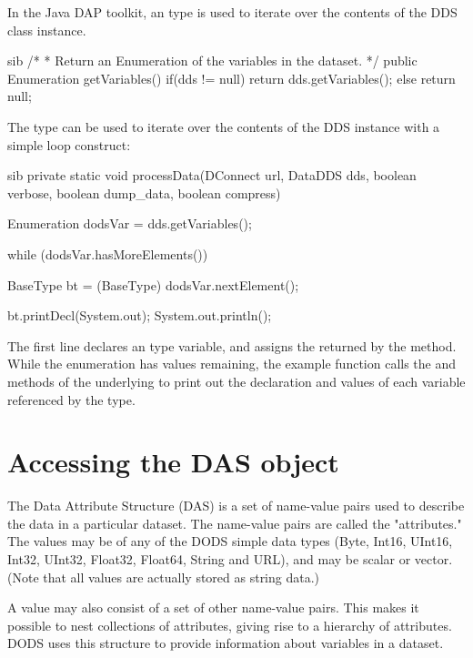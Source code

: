 \documentclass{dods-paper}
\begin{document}
In the Java DAP toolkit, an  type is used to iterate over 
the contents of the DDS class instance.
 
\begin{vcode}{sib}
 /*
  * Return an Enumeration of the variables in the dataset.
  */
 public Enumeration getVariables() {
    if(dds != null) 
        return dds.getVariables();
    else
        return null;
 }
\end{vcode}

The  type can be used to iterate over
the contents of the DDS instance with a simple loop
construct:

\begin{vcode}{sib}
 private static void processData(DConnect url, DataDDS dds, boolean verbose,
                                  boolean dump_data, boolean compress) {

   Enumeration dodsVar = dds.getVariables();

   while (dodsVar.hasMoreElements()) {
      BaseType bt = (BaseType) dodsVar.nextElement();

      bt.printDecl(System.out);
      System.out.println();
   }
}
\end{vcode}
    
The first line declares an  type variable,  and 
assigns the  returned by the   method.
While the enumeration has values remaining, the example function calls the
 and  methods of the underlying  to print out
the declaration and values of each variable referenced by the  type.

\section{Accessing the DAS object}

The Data Attribute Structure (DAS) is a set of name-value pairs used
to describe the data in a particular dataset. The name-value pairs are
called the "attributes." The values may be of any of the DODS simple
data types (Byte, Int16, UInt16, Int32, UInt32, Float32, Float64,
String and URL), and may be scalar or vector. (Note that all values
are actually stored as string data.)

A value may also consist of a set of other name-value pairs. This
makes it possible to nest collections of attributes, giving rise to a
hierarchy of attributes. DODS uses this structure to provide
information about variables in a dataset.
\end{document}

